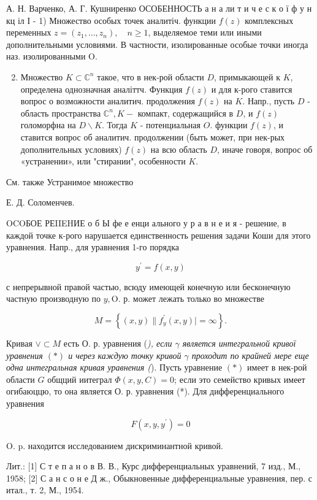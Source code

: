 \documentclass[10pt]{article}
\begin{document}
А. Н. Варченко, А. Г. Кушниренко ОСОБЕННОСТЬ а н а ли т и ч е с к о ї ф у н кц іл І - 1) Множество особых точек аналитіч. функции $f(z)$ комплексных переменных $z=\left(z_{1}, \ldots, z_{n}\right), \quad n \geqslant 1$, выделяемое теми или иными дополнительными условиями. В частности, изолированные особые точки иногда наз. изолированными $\mathrm{O}$.

\begin{enumerate}
  \setcounter{enumi}{1}
  \item Множество $K \subset \mathbb{C}^{n}$ такое, что в нек-рой области $D$, примыкающей к $K$, определена однозначная аналіттч. Функция $f(z)$ и для к-рого ставится вопрос о возможности аналитич. продолжения $f(z)$ на $K$. Напр., пусть $D$ - область пространства $\mathbb{C}^{n}, K-$ компакт, содержащийся в $D$, и $f(z)$ голоморфна на $D \backslash K$. Тогда $K$ - потенциальная $O$. функции $f(z)$, и ставится вопрос об аналитич. продолжении (быть может, при нек-рых дополнительных условиях) $f(z)$ на всю область $D$, иначе говоря, вопрос об «устранении», или "стирании", особенности $K$.
\end{enumerate}

См. также Устранимое множество

Е. Д. Соломенчев.

OCOБОЕ РЕIIEHИЕ о б Ы фе е енци ального у р а в н е и я - решение, в каждой точке к-рого нарушается единственность решения задачи Коши для этого уравнения. Напр., для уравнения 1-го порядка

\[
y^{\prime}=f(x, y)
\]

с непрерывной правой частью, всюду имеющей конечную или бесконечную частную производную по $y, \mathrm{O}$. р. может лежать только во множестве

\[
M=\left\{(x, y) \| f_{y}^{\prime}(x, y) \mid=\infty\right\} .
\]

Кривая $\vee \subset M$ есть О. р. уравнения (\textit{), если $\gamma$ является интегральной кривої уравнения $(*)$ и через каждую точку кривой $\gamma$ проходит по крайней мере еще одна интегральная кривая уравнения (}). Пусть уравнение $(*)$ имеет в нек-рой области $G$ общций иитеграл $\Phi(x, y, C)=0$; если это семейство кривых имеет огибаюццю, то она является О. р. уравнения (*). Для дифференциального уравнения

\[
F\left(x, y, y^{\prime}\right)=0
\]

O. p. находится исследованием дискриминантной кривой.

Лит.: [1] С т е п а н о в В. В., Курс дифференциальных уравнений, 7 изд., М., 1958; [2] С а н с о н е Д ж., Обыкновенные дифференциальные уравнения, пер. с итал., т. 2, М., 1954.
\end{document}
